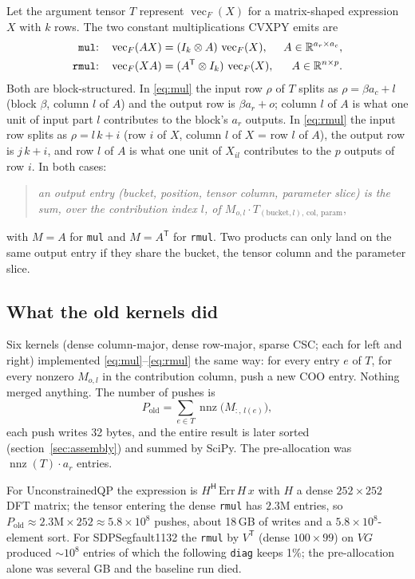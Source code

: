 \documentclass[11pt,a4paper]{article}
\newcommand{\vecF}{\operatorname{vec}_F}
\newcommand{\nnz}{\operatorname{nnz}}
\newcommand{\R}{\mathbb{R}}
\newcommand{\code}[1]{\texttt{#1}}
\newcommand{\T}{\mathsf{T}}
\begin{document}
Let the argument tensor $T$ represent $\vecF(X)$ for a matrix-shaped expression $X$ with $k$ rows.
The two constant multiplications CVXPY emits are
\begin{align}
  \text{\code{mul}:}\quad & \vecF(AX) = (I_k \otimes A)\,\vecF(X), & A \in \R^{a_r \times a_c}, \label{eq:mul}\\
  \text{\code{rmul}:}\quad & \vecF(XA) = (A^\T \otimes I_k)\,\vecF(X), & A \in \R^{n \times p}. \label{eq:rmul}
\end{align}
Both are block-structured. In \eqref{eq:mul} the input row $\rho$ of $T$ splits as
$\rho = \beta a_c + l$ (block $\beta$, column $l$ of $A$) and the output row is $\beta a_r + o$; column
$l$ of $A$ is what one unit of input part $l$ contributes to the block's $a_r$ outputs. In
\eqref{eq:rmul} the input row splits as $\rho = l\,k + i$ (row $i$ of $X$, column $l$ of $X$ = row $l$ of
$A$), the output row is $j\,k + i$, and row $l$ of $A$ is what one unit of $X_{il}$ contributes to the $p$
outputs of row $i$. In both cases:
\begin{quote}
\emph{an output entry (bucket, position, tensor column, parameter slice) is the sum, over the
contribution index $l$, of $M_{o,l} \cdot T_{(\text{bucket},l),\,\text{col},\,\text{param}}$},
\end{quote}
with $M = A$ for \code{mul} and $M = A^\T$ for \code{rmul}. Two products can only land on the same
output entry if they share the bucket, the tensor column and the parameter slice.

\subsection{What the old kernels did}

Six kernels (dense column-major, dense row-major, sparse CSC; each for left and right) implemented
\eqref{eq:mul}--\eqref{eq:rmul} the same way: for every entry $e$ of $T$, for every nonzero $M_{o,l}$ in
the contribution column, push a new COO entry. Nothing merged anything. The number of pushes is
\begin{equation}
  \label{eq:pushes}
  P_{\text{old}} = \sum_{e \in T} \nnz\big(M_{:,\,l(e)}\big),
\end{equation}
each push writes 32 bytes, and the entire result is later sorted (section~\ref{sec:assembly}) and
summed by SciPy. The pre-allocation was $\nnz(T)\cdot a_r$ entries.

For UnconstrainedQP the expression is $H^{\mathsf H}\,\mathrm{Err}\,H\,x$ with $H$ a dense
$252\times252$ DFT matrix; the tensor entering the dense \code{rmul} has $2.3$M entries, so
$P_{\text{old}} \approx 2.3\text{M} \times 252 \approx 5.8\times10^8$ pushes, about 18\,GB of
writes and a $5.8\times10^8$-element sort. For SDPSegfault1132 the \code{rmul} by $V^\T$ (dense
$100\times99$) on $V G$ produced $\sim 10^8$ entries of which the following \code{diag} keeps 1\%;
the pre-allocation alone was several GB and the baseline run died.
\end{document}

